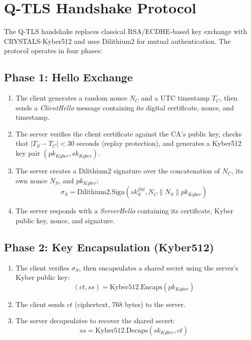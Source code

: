 \section{Q-TLS Handshake Protocol}

The Q-TLS handshake replaces classical RSA/ECDHE-based key exchange with CRYSTALS-Kyber512 and uses Dilithium2 for mutual authentication. The protocol operates in four phases:

\subsection{Phase 1: Hello Exchange}

\begin{enumerate}
    \item The client generates a random nonce $N_C$ and a UTC timestamp $T_C$, then sends a \textit{ClientHello} message containing its digital certificate, nonce, and timestamp.
    \item The server verifies the client certificate against the CA's public key, checks that $|T_S - T_C| < 30$ seconds (replay protection), and generates a Kyber512 key pair $(pk_{Kyber}, sk_{Kyber})$.
    \item The server creates a Dilithium2 signature over the concatenation of $N_C$, its own nonce $N_S$, and $pk_{Kyber}$:
    \[
    \sigma_S = \text{Dilithium2.Sign}(sk_S^{Dil}, N_C \| N_S \| pk_{Kyber})
    \]
    \item The server responds with a \textit{ServerHello} containing its certificate, Kyber public key, nonce, and signature.
\end{enumerate}

\subsection{Phase 2: Key Encapsulation (Kyber512)}

\begin{enumerate}
    \item The client verifies $\sigma_S$, then encapsulates a shared secret using the server's Kyber public key:
    \[
    (ct, ss) = \text{Kyber512.Encaps}(pk_{Kyber})
    \]
    \item The client sends $ct$ (ciphertext, 768 bytes) to the server.
    \item The server decapsulates to recover the shared secret:
    \[
    ss = \text{Kyber512.Decaps}(sk_{Kyber}, ct)
    \]
\end{enumerate}

